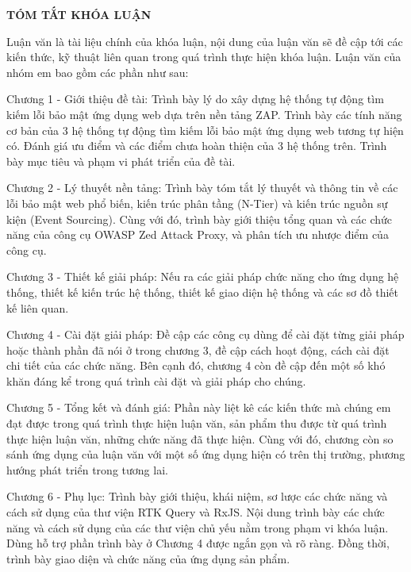 \newpage
{}
\begin{center}
\textbf{\Large TÓM TẮT KHÓA LUẬN }
\vspace{1cm}
\end{center}

Luận văn là tài liệu chính của khóa luận, nội dung của luận văn sẽ đề cập tới các kiến thức, kỹ thuật liên quan trong quá trình thực hiện khóa luận. Luận văn của nhóm em bao gồm các phần như sau:

Chương 1 - Giới thiệu đề tài: Trình bày lý do xây dựng hệ thống tự động tìm kiếm lỗi bảo mật ứng dụng web dựa trên nền tảng ZAP. Trình bày các tính năng cơ bản của 3 hệ thống tự động tìm kiếm lỗi bảo mật ứng dụng web tương tự hiện có. Đánh giá ưu điểm và các điểm chưa hoàn thiện của 3 hệ thống trên. Trình bày mục tiêu và phạm vi phát triển của đề tài.

Chương 2 - Lý thuyết nền tảng: Trình bày tóm tắt lý thuyết và thông tin về các lỗi bảo mật web phổ biến, kiến trúc phân tầng (N-Tier) và kiến trúc nguồn sự kiện (Event Sourcing).
Cùng với đó, trình bày giới thiệu tổng quan và các chức năng của công cụ OWASP Zed Attack Proxy, và phân tích ưu nhược điểm của công cụ.

Chương 3 - Thiết kế giải pháp: Nếu ra các giải pháp chức năng cho ứng dụng hệ thống, thiết kế kiến trúc hệ thống, thiết kế giao diện hệ thống và các sơ đồ thiết kế liên quan.

Chương 4 - Cài đặt giải pháp: Đề cập các công cụ dùng để cài đặt từng giải pháp hoặc thành phần đã nói ở trong chương 3, đề cập cách hoạt động, cách cài đặt chi tiết của các chức năng. Bên cạnh đó, chương 4 còn đề cập đến một số khó khăn đáng kể trong quá trình cài đặt và giải pháp cho chúng.

Chương 5 - Tổng kết và đánh giá: Phần này liệt kê các kiến thức mà chúng em đạt được trong quá trình thực hiện luận văn, sản phẩm thu được từ quá trình thực hiện luận văn, những chức năng đã thực hiện. Cùng với đó, chương còn so sánh ứng dụng của luận văn với một số ứng dụng hiện có trên thị trường, phương hướng phát triển trong tương lai.

Chương 6 - Phụ lục: Trình bày giới thiệu, khái niệm, sơ lược các chức năng và cách sử dụng của thư viện RTK Query và RxJS.
Nội dung trình bày các chức năng và cách sử dụng của các thư viện chủ yếu nằm trong phạm vi khóa luận.
Dùng hỗ trợ phần trình bày ở Chương 4 được ngắn gọn và rõ ràng.
Đồng thời, trình bày giao diện và chức năng của ứng dụng sản phẩm.

